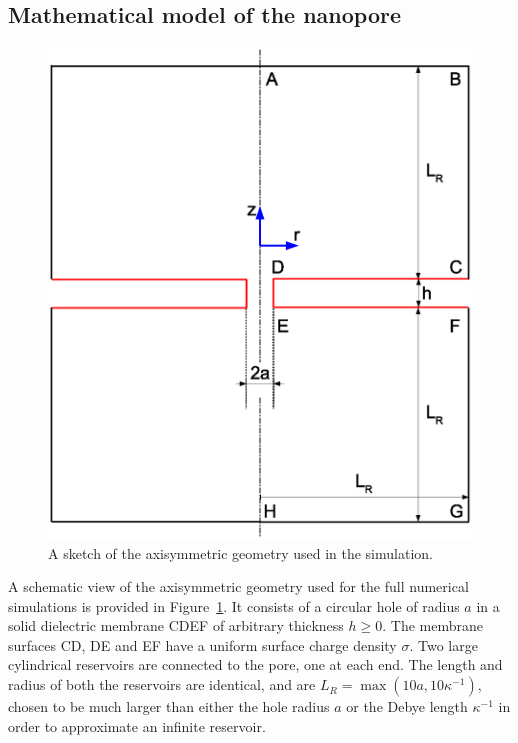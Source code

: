 \subsection{Mathematical model of the nanopore}\label{sec:math_model}
\begin{figure}[h]
\centering
\includegraphics[width=1.0\textwidth]{zero_thickness/figure4.eps}
\caption{A sketch of the axisymmetric geometry used in the simulation.}
\label{fig:system}
\end{figure}
A schematic view of the axisymmetric geometry used for the full numerical
simulations is provided in Figure~\ref{fig:system}. It consists of a circular hole of radius $a$ in a solid dielectric membrane CDEF of arbitrary thickness $h\ge 0$. The membrane surfaces CD, DE and EF have a uniform surface charge density $\sigma$. Two large cylindrical reservoirs are connected to the pore, one at each end. The length and radius of both the reservoirs are identical, and are
$L_R=\max(10a, 10\kappa^{-1})$, chosen to be much larger than either the hole radius $a$ or the Debye length $\kappa^{-1}$  in order to approximate an infinite reservoir. 


